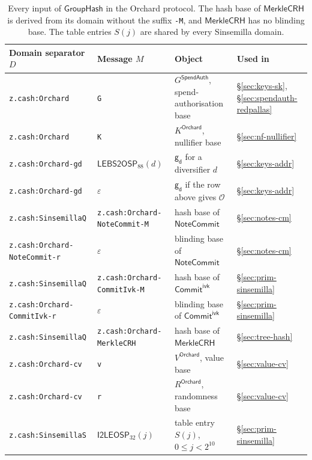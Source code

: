 \documentclass[11pt,a4paper]{article}
\theoremstyle{definition}
\newcommand{\NoteCommit}{\ensuremath{\mathsf{NoteCommit}}}
\newcommand{\CommitIvk}{\ensuremath{\mathsf{Commit}^{\mathsf{ivk}}}}
\newcommand{\GroupHash}{\ensuremath{\mathsf{GroupHash}}}
\newcommand{\gd}{\ensuremath{\mathsf{g_d}}}
\begin{document}
\begin{table}[ht]
\centering\footnotesize\setlength{\tabcolsep}{4pt}
\begin{tabular}{@{}llll@{}}
\toprule
Domain separator $D$ & Message $M$ & Object & Used in \\
\midrule
\texttt{z.cash:Orchard} & \texttt{G}
  & $G^{\mathsf{SpendAuth}}$, spend-authorisation base
  & \S\ref{sec:keys-sk}, \S\ref{sec:spendauth-redpallas} \\
\texttt{z.cash:Orchard} & \texttt{K}
  & $K^{\mathsf{Orchard}}$, nullifier base & \S\ref{sec:nf-nullifier} \\
\texttt{z.cash:Orchard-gd} & $\mathsf{LEBS2OSP}_{88}(d)$
  & $\gd$ for a diversifier $d$ & \S\ref{sec:keys-addr} \\
\texttt{z.cash:Orchard-gd} & $\varepsilon$
  & $\gd$ if the row above gives $\mathcal{O}$ & \S\ref{sec:keys-addr} \\
\texttt{z.cash:SinsemillaQ} & \texttt{z.cash:Orchard-NoteCommit-M}
  & hash base of $\NoteCommit$ & \S\ref{sec:notes-cm} \\
\texttt{z.cash:Orchard-NoteCommit-r} & $\varepsilon$
  & blinding base of $\NoteCommit$ & \S\ref{sec:notes-cm} \\
\texttt{z.cash:SinsemillaQ} & \texttt{z.cash:Orchard-CommitIvk-M}
  & hash base of $\CommitIvk$ & \S\ref{sec:prim-sinsemilla} \\
\texttt{z.cash:Orchard-CommitIvk-r} & $\varepsilon$
  & blinding base of $\CommitIvk$ & \S\ref{sec:prim-sinsemilla} \\
\texttt{z.cash:SinsemillaQ} & \texttt{z.cash:Orchard-MerkleCRH}
  & hash base of $\mathsf{MerkleCRH}$ & \S\ref{sec:tree-hash} \\
\texttt{z.cash:Orchard-cv} & \texttt{v}
  & $V^{\mathsf{Orchard}}$, value base & \S\ref{sec:value-cv} \\
\texttt{z.cash:Orchard-cv} & \texttt{r}
  & $R^{\mathsf{Orchard}}$, randomness base & \S\ref{sec:value-cv} \\
\texttt{z.cash:SinsemillaS} & $\mathsf{I2LEOSP}_{32}(j)$
  & table entry $S(j)$, $0 \le j < 2^{10}$ & \S\ref{sec:prim-sinsemilla} \\
\bottomrule
\end{tabular}
\caption{Every input of $\GroupHash$ in the Orchard protocol. The hash base
of $\mathsf{MerkleCRH}$ is derived from its domain without the suffix
\texttt{-M}, and $\mathsf{MerkleCRH}$ has no blinding base. The table
entries $S(j)$ are shared by every Sinsemilla domain.}
\label{tab:prim-grouphash}
\end{table}
\end{document}
